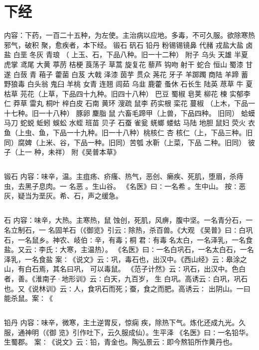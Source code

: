 \documentclass[12pt,UTF8]{ctexbook}
\begin{document}
\part{下经}

内容：下药，一百二十五种，为左使。主治病以应地。多毒，不可久服。欲除寒热邪气，破积 
聚，愈疾者，本下经。 
锻石 矾石 铅丹 粉锡锡镜鼻 代赭 戎盐大盐 卤盐 白垩 冬灰 青琅 （ 
上玉、石，下品八种。旧一十二种） 附子 乌头 天雄 半夏 虎掌 鸢尾 大黄 葶苈 
桔梗 莨荡子 草蒿 旋复花 藜芦 钩吻 射干 蛇合 恒山 蜀漆 甘遂 白蔹 青 
葙子 藿菌 白芨 大戟 泽漆 茵芋 贯众 荛花 牙子 羊踯躅 商陆 羊蹄 蓄 
野狼毒 白头翁 鬼臼 羊桃 女青 连翘 闾茹 乌韭 鹿藿 蚤休 石长生 陆英 荩草 
牛 夏枯草 芫花（上草，下品四十九种。旧四十八种） 巴豆 蜀椒 皂荚 柳花 楝 
实郁李仁 莽草 雷丸 桐叶 梓白皮 石南 黄环 溲疏 鼠李 药实根 栾花 蔓椒 
（上木，下品一十七种。旧一十八种） 豚卵 麇脂 鼠 六畜毛蹄甲（上兽，下品四种。 
旧同） 蛤蟆 马刀 蛇蜕 蚯蚓 蜈蚣 水蛭 班苗 贝子 石蚕 雀瓮 蜣螂 
蝼蛄 马陆 地胆 鼠妇 荧火 衣鱼（上虫、鱼，下品一十九种。旧一十八种）桃核仁 杏 
核仁（上，下品三种。旧同）腐婢（上米、谷，下品一种。旧同）苦瓠 水靳（上菜，下品 
二种。旧同） 彼子（上一 
种，未祥） 
附《吴普本草》 


\chapter{}锻石
内容：味辛，温。主疽疡、疥瘙、热气，恶创、癞疾、死肌，堕眉，杀痔虫，去黑子息肉。一 
名恶 。生山谷。 
《名医》曰∶一名希 。生中山。 
按∶恶灰，疑当为垩灰。希、石，声之缓急。 


\chapter{}石
内容：味辛，大热。主寒热，鼠 蚀创，死肌，风痹，腹中坚。一名青分石，一名立制石，一 
名固羊石（《御览》引云∶除热，杀百兽。《大观 
《吴普》曰∶白巩石，一名鼠乡。神农、岐伯∶辛，有毒；桐 
君∶有毒 
名太白，一名泽乳，一名食盐。又云∶李氏∶大寒，主温热）。 
《名医》曰∶一名白巩石，一名太白石，一名泽乳，一名食盐 
案∶《说文》云∶巩，毒石也，出汉中。《西山经》云∶皋涂之山，有白石焉，其名曰巩， 
可以毒鼠。 
《范子计然》云∶巩石，出汉中。色白者，善。《淮南子·地形训》云∶白天，九百岁， 
生 
白巩。高诱云∶白巩，巩石也。又《说林训》云∶人，食巩石而死；蚕，食之而肥。高诱云∶ 
出阴山。一曰能杀鼠。案∶《 


\chapter{}铅丹
内容：味辛，微寒，主土逆胃反，惊痫 疾，除热下气。炼化还成九光。久服，通神明（《御 
览》引作吐下，云久服成仙）。生平泽 
《名医》曰∶一名铅华。生蜀郡。 
案∶《说文》云∶铅，青金也。陶弘景云∶即今熬铅所作黄丹也。 
\end{document}

